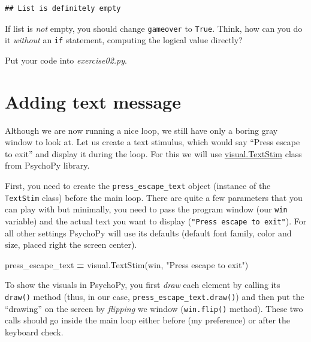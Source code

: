 \documentclass[
]{book}
\newenvironment{Shaded}{\begin{snugshade}}{\end{snugshade}}
\newcommand{\NormalTok}[1]{#1}
\newcommand{\OperatorTok}[1]{\textcolor[rgb]{0.81,0.36,0.00}{\textbf{#1}}}
\newcommand{\StringTok}[1]{\textcolor[rgb]{0.31,0.60,0.02}{#1}}
\begin{document}
\begin{verbatim}
## List is definitely empty
\end{verbatim}

If list is \emph{not} empty, you should change \texttt{gameover} to \texttt{True}. Think, how can you do it \emph{without} an \texttt{if} statement, computing the logical value directly?

Put your code into \emph{exercise02.py}.

\hypertarget{adding-text-message}{%
\section{Adding text message}\label{adding-text-message}}

Although we are now running a nice loop, we still have only a boring gray window to look at. Let us create a text stimulus, which would say ``Press escape to exit'' and display it during the loop. For this we will use \href{https://psychopy.org/api/visual/textstim.html}{visual.TextStim} class from PsychoPy library.

First, you need to create the \texttt{press\_escape\_text} object (instance of the \texttt{TextStim} class) before the main loop. There are quite a few parameters that you can play with but minimally, you need to pass the program window (our \texttt{win} variable) and the actual text you want to display (\texttt{"Press\ escape\ to\ exit"}). For all other settings PsychoPy will use its defaults (default font family, color and size, placed right the screen center).

\begin{Shaded}
\begin{Highlighting}[]
\NormalTok{press\_escape\_text }\OperatorTok{=}\NormalTok{ visual.TextStim(win, }\StringTok{"Press escape to exit"}\NormalTok{)}
\end{Highlighting}
\end{Shaded}

To show the visuals in PsychoPy, you first \emph{draw} each element by calling its \texttt{draw()} method (thus, in our case, \texttt{press\_escape\_text.draw()}) and then put the ``drawing'' on the screen by \emph{flipping} we window (\texttt{win.flip()} method). These two calls should go inside the main loop either before (my preference) or after the keyboard check.
\end{document}
